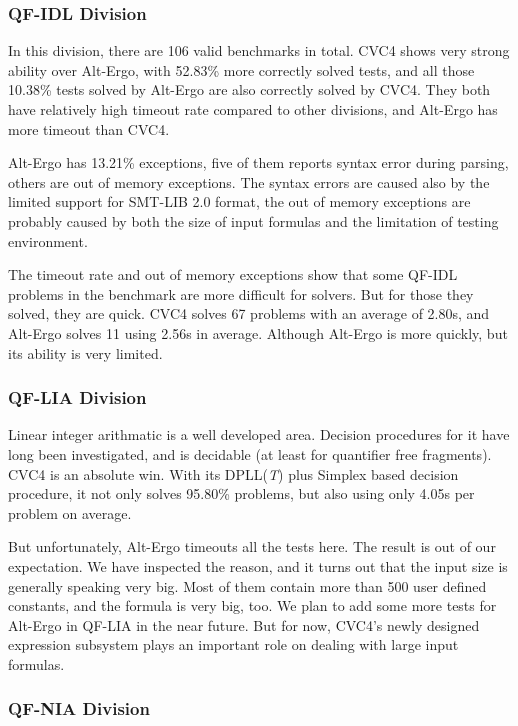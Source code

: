 \documentclass[10pt,letter]{article}
\theoremstyle{definition}
\begin{document}
\subsubsection{QF-IDL Division}

In this division, there are 106 valid benchmarks in total. CVC4 shows very strong ability over Alt-Ergo, with 52.83\% more correctly solved tests, and all those 10.38\% tests solved by Alt-Ergo are also correctly solved by CVC4. They both have relatively high timeout rate compared to other divisions, and Alt-Ergo has more timeout than CVC4. 

Alt-Ergo has 13.21\% exceptions, five of them reports syntax error during parsing, others are out of memory exceptions. The syntax errors are caused also by the limited support for SMT-LIB 2.0 format, the out of memory exceptions are probably caused by both the size of input formulas and the limitation of testing environment. 

The timeout rate and out of memory exceptions show that some QF-IDL problems in the benchmark are more difficult for solvers. But for those they solved, they are quick. CVC4 solves 67 problems with an average of 2.80s, and Alt-Ergo solves 11 using 2.56s in average. Although Alt-Ergo is more quickly, but its ability is very limited.

\subsubsection{QF-LIA Division}

Linear integer arithmatic is a well developed area. Decision procedures for it have long been investigated, and is decidable (at least for quantifier free fragments). CVC4 is an absolute win. With its DPLL({\it T}) plus Simplex based decision procedure\cite{barrett:cvc4:2011}, it not only solves 95.80\% problems, but also using only 4.05s per problem on average.

But unfortunately, Alt-Ergo timeouts all the tests here. The result is out of our expectation. We have inspected the reason, and it turns out that the input size is generally speaking very big. Most of them contain more than 500 user defined constants, and the formula is very big, too. We plan to add some more tests for Alt-Ergo in QF-LIA in the near future. But for now, CVC4's newly designed expression subsystem\cite{barrett:cvc4:2011} plays an important role on dealing with large input formulas.

\subsubsection{QF-NIA Division}
\end{document}
